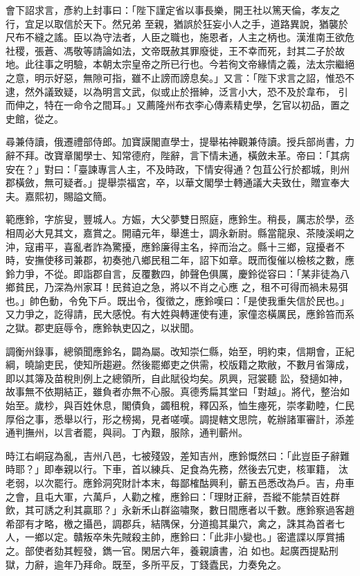 \begin{pinyinscope}
 會下詔求言，彥約上封事曰：「陛下謹定省以事長樂，開王社以篤天倫，孝友之行，宜足以取信於天下。然兄弟
 至親，猶誤於狂妄小人之手，道路異說，猶襲於尺布不縫之謠。臣以為守法者，人臣之職也，施恩者，人主之柄也。漢淮南王欲危社稷，張蒼、馮敬等請論如法，文帝既赦其罪廢徙，王不幸而死，封其二子於故地。此往事之明驗，本朝太宗皇帝之所已行也。今若徇文帝緣情之義，法太宗繼絕之意，明示好惡，無隙可指，雖不止謗而謗息矣。」又言：「陛下求言之詔，惟恐不逮，然外議致疑，以為明言文武，似或止於搢紳，泛言小大，恐不及於韋布，
 引而伸之，特在一命令之間耳。」又薦隆州布衣李心傳素精史學，乞官以初品，置之史館，從之。



 尋兼侍讀，俄遷禮部侍郎。加寶謨閣直學士，提舉祐神觀兼侍讀。授兵部尚書，力辭不拜。改寶章閣學士、知常德府，陛辭，言下情未通，橫斂未革。帝曰：「其病安在？」對曰：「臺諫專言人主，不及時政，下情安得通？包苴公行於都城，則州郡橫斂，無可疑者。」提舉崇福宮，卒，以華文閣學士轉通議大夫致仕，贈宣奉大夫。嘉熙初，賜謚文簡。



 範應鈴，字旂叟，豐城人。方娠，大父夢雙日照庭，應鈴生。稍長，厲志於學，丞相周必大見其文，嘉賞之。開禧元年，舉進士，調永新尉。縣當龍泉、茶陵溪峒之沖，寇甫平，喜亂者詐為驚擾，應鈴廉得主名，捽而治之。縣十三鄉，寇擾者不時，安撫使移司兼郡，初奏弛八鄉民租二年，詔下如章。既而復催以檢核之數，應鈴力爭，不從。即詣郡自言，反覆數四，帥聲色俱厲，慶鈴從容曰：「某非徒為八鄉貧民，乃深為州家耳！民貧迫之急，將以不肖之心應
 之，租不可得而禍未易弭也。」帥色動，令免下戶。既出令，復徵之，應鈴嘆曰：「是使我重失信於民也。」又力爭之，訖得請，民大感悅。有大姓與轉運使有連，家僮恣橫厲民，應鈴笞而系之獄。郡吏庭辱令，應鈴執吏囚之，以狀聞。



 調衡州錄事，總領聞應鈴名，闢為屬。改知崇仁縣，始至，明約束，信期會，正紀綱，曉諭吏民，使知所趨避。然後罷鄉吏之供需，校版籍之欺敝，不數月省簿成，即以其簿及苗稅則例上之總領所，自此賦役均矣。夙興，冠裳聽
 訟，發擿如神，故事無不依期結正，雖負者亦無不心服。真德秀扁其堂曰「對越」。將代，整治如始至。歲杪，與百姓休息，閣債負，蠲租稅，釋囚系，恤生瘞死，崇孝勸睦，仁民厚俗之事，悉舉以行，形之榜揭，見者嗟嘆。調提轄文思院，乾辦諸軍審計，添差通判撫州，以言者罷，與祠。丁內艱，服除，通判蘄州。



 時江右峒寇為亂，吉州八邑，七被殘毀，差知吉州，應鈴慨然曰：「此豈臣子辭難時耶？」即奉親以行。下車，首以練兵、足食為先務，然後去冗吏，核軍籍，
 汰老弱，以次罷行。應鈴洞究財計本末，每鄙榷酤興利，蘄五邑悉改為戶。吉，舟車之會，且屯大軍，六萬戶，人勸之榷，應鈴曰：「理財正辭，吾縱不能禁百姓群飲，其可誘之利其贏耶？」永新禾山群盜嘯聚，數日間應者以千數。應鈴察過客趙希邵有才略，檄之攝邑，調郡兵，結隅保，分道搗其巢穴，禽之，誅其為首者七人，一鄉以定。贛叛卒朱先賊殺主帥，應鈴曰：「此非小變也。」密遣諜以厚賞捕之。部使者劾其輕發，鐫一官。閑居六年，養親讀書，泊
 如也。起廣西提點刑獄，力辭，逾年乃拜命。既至，多所平反，丁錢蠹民，力奏免之。




\end{pinyinscope}
